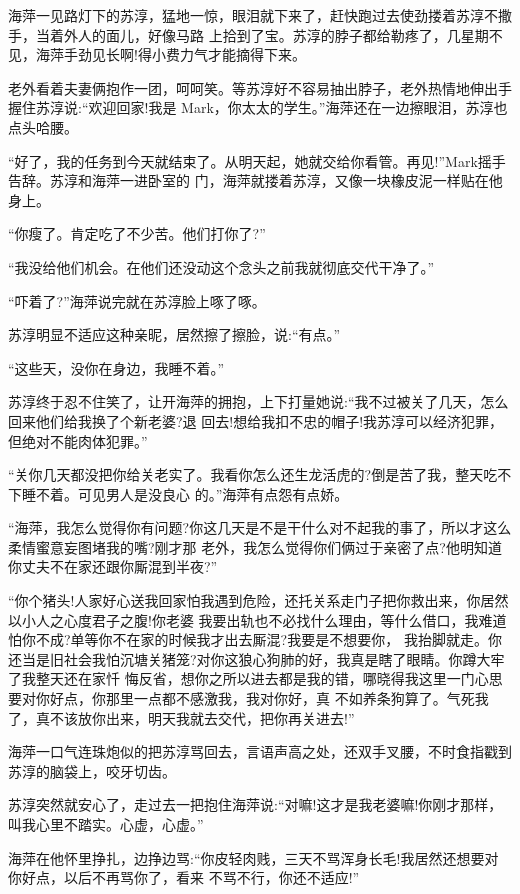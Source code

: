 \documentclass[11pt,a4paper,onecolumn]{article}
\begin{document}
海萍一见路灯下的苏淳，猛地一惊，眼泪就下来了，赶快跑过去使劲搂着苏淳不撒手，当着外人的面儿，好像马路
上拾到了宝。苏淳的脖子都给勒疼了，几星期不见，海萍手劲见长啊!得小费力气才能摘得下来。

老外看着夫妻俩抱作一团，呵呵笑。等苏淳好不容易抽出脖子，老外热情地伸出手握住苏淳说:``欢迎回家!我是
Mark，你太太的学生。''海萍还在一边擦眼泪，苏淳也点头哈腰。

``好了，我的任务到今天就结束了。从明天起，她就交给你看管。再见!''Mark摇手告辞。苏淳和海萍一进卧室的
门，海萍就搂着苏淳，又像一块橡皮泥一样贴在他身上。

``你瘦了。肯定吃了不少苦。他们打你了?''

``我没给他们机会。在他们还没动这个念头之前我就彻底交代干净了。''

``吓着了?''海萍说完就在苏淳脸上啄了啄。

苏淳明显不适应这种亲昵，居然擦了擦脸，说:``有点。''

``这些天，没你在身边，我睡不着。''

苏淳终于忍不住笑了，让开海萍的拥抱，上下打量她说:``我不过被关了几天，怎么回来他们给我换了个新老婆?退
回去!想给我扣不忠的帽子!我苏淳可以经济犯罪，但绝对不能肉体犯罪。''

``关你几天都没把你给关老实了。我看你怎么还生龙活虎的?倒是苦了我，整天吃不下睡不着。可见男人是没良心
的。''海萍有点怨有点娇。

``海萍，我怎么觉得你有问题?你这几天是不是干什么对不起我的事了，所以才这么柔情蜜意妄图堵我的嘴?刚才那
老外，我怎么觉得你们俩过于亲密了点?他明知道你丈夫不在家还跟你厮混到半夜?''

``你个猪头!人家好心送我回家怕我遇到危险，还托关系走门子把你救出来，你居然以小人之心度君子之腹!你老婆
我要出轨也不必找什么理由，等什么借口，我难道怕你不成?单等你不在家的时候我才出去厮混?我要是不想要你，
我抬脚就走。你还当是旧社会我怕沉塘关猪笼?对你这狼心狗肺的好，我真是瞎了眼睛。你蹲大牢了我整天还在家忏
悔反省，想你之所以进去都是我的错，哪晓得我这里一门心思要对你好点，你那里一点都不感激我，我对你好，真
不如养条狗算了。气死我了，真不该放你出来，明天我就去交代，把你再关进去!''

海萍一口气连珠炮似的把苏淳骂回去，言语声高之处，还双手叉腰，不时食指戳到苏淳的脑袋上，咬牙切齿。

苏淳突然就安心了，走过去一把抱住海萍说:``对嘛!这才是我老婆嘛!你刚才那样，叫我心里不踏实。心虚，心虚。''

海萍在他怀里挣扎，边挣边骂:``你皮轻肉贱，三天不骂浑身长毛!我居然还想要对你好点，以后不再骂你了，看来
不骂不行，你还不适应!''
\end{document}
